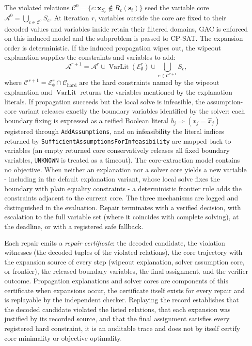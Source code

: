 \documentclass[pdflatex,sn-mathphys-num,iicol,oneside]{sn-jnl}
\newcommand{\cpsat}{\textsc{CP-SAT}}
\begin{document}
The violated relations
$\mathcal{C}^{0}=\{c:\widehat{\bm{x}}_{S_c}\notin R_c(\bm{s}_t)\}$
seed the variable core
$\mathcal{A}^{0}=\bigcup_{c\in\mathcal{C}^{0}}S_c$. At iteration $r$,
variables outside the core are fixed to their decoded values and
variables inside retain their filtered domains, GAC is enforced on
this induced model and the subproblem is passed to \cpsat. The
expansion order is deterministic. If the induced propagation wipes
out, the wipeout explanation supplies the constraints and variables to
add:
\begin{equation}
\mathcal{A}^{r+1}=\mathcal{A}^{r}
\cup\operatorname{VarLit}(\mathcal{E}_{\emptyset}^{r})
\cup\bigcup_{c\in\mathcal{C}^{r+1}}S_c ,
\label{eq:variable-expansion}
\end{equation}
where $\mathcal{C}^{r+1}=\mathcal{E}_{\emptyset}^{r}\cap
\mathcal{C}_{\mathrm{hard}}$ are the hard constraints named by the
wipeout explanation and $\operatorname{VarLit}$ returns the variables
mentioned by the explanation literals. If propagation succeeds but the local solve is
infeasible, the assumption-core variant releases exactly the boundary
variables identified by the solver: each boundary fixing is expressed
as a reified Boolean literal $b_j\Rightarrow(x_j=\widehat{x}_j)$
registered through \texttt{AddAssumptions}, and on infeasibility the
literal indices returned by
\texttt{SufficientAssumptionsForInfeasibility} are mapped back to
variables (an empty returned core conservatively releases all fixed
boundary variables, \texttt{UNKNOWN} is treated as a timeout). The
core-extraction model contains no objective. When neither an
explanation nor a solver core yields a new variable - including in the
default explanation variant, whose local solve fixes the boundary with
plain equality constraints - a deterministic frontier rule adds the
constraints adjacent to the current core. The three mechanisms are
logged and distinguished in the evaluation. Repair terminates with a
verified decision, with escalation to the full variable set (where it
coincides with complete solving), at the deadline, or with a
registered safe fallback.

Each repair emits a \emph{repair certificate}: the decoded candidate,
the violation witnesses (the decoded tuples of the violated
relations), the core trajectory with the expansion source of every
step (wipeout explanation, solver assumption core, or frontier), the
released boundary variables, the final assignment, and the verifier
outcome. Propagation explanations and solver cores are components of
this certificate when expansions occur, the certificate itself exists
for every repair and is replayable by the independent checker.
Replaying the record establishes that the decoded candidate violated
the listed relations, that each expansion was justified by its
recorded source, and that the final assignment satisfies every
registered hard constraint, it is an auditable trace and does not by
itself certify core minimality or objective optimality.
\end{document}
